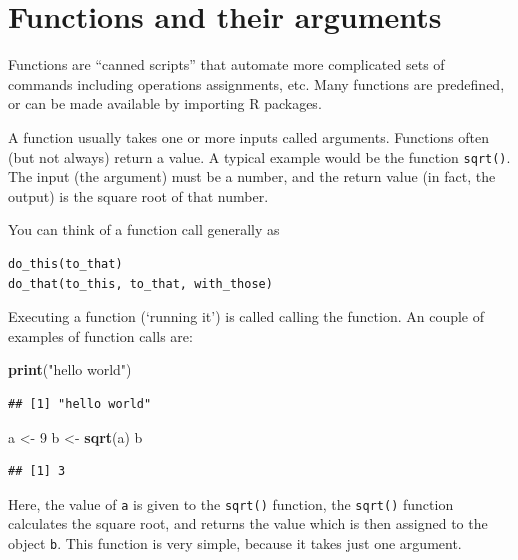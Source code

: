 \documentclass[
]{book}
\newenvironment{Shaded}{\begin{snugshade}}{\end{snugshade}}
\newcommand{\DecValTok}[1]{\textcolor[rgb]{0.00,0.00,0.81}{#1}}
\newcommand{\FunctionTok}[1]{\textcolor[rgb]{0.13,0.29,0.53}{\textbf{#1}}}
\newcommand{\NormalTok}[1]{#1}
\newcommand{\OtherTok}[1]{\textcolor[rgb]{0.56,0.35,0.01}{#1}}
\newcommand{\StringTok}[1]{\textcolor[rgb]{0.31,0.60,0.02}{#1}}
\begin{document}
\section{Functions and their arguments}\label{functions-and-their-arguments}

Functions are ``canned scripts'' that automate more complicated sets of commands including operations assignments, etc. Many functions are predefined, or can be made available by importing R packages.

A function usually takes one or more inputs called arguments. Functions often (but not always) return a value. A typical example would be the function \texttt{sqrt()}. The input (the argument) must be a number, and the return value (in fact, the output) is the square root of that number.

You can think of a function call generally as

\begin{verbatim}
do_this(to_that)
do_that(to_this, to_that, with_those)
\end{verbatim}

Executing a function (`running it') is called calling the function. An couple of examples of function calls are:

\begin{Shaded}
\begin{Highlighting}[]
\FunctionTok{print}\NormalTok{(}\StringTok{"hello world"}\NormalTok{)}
\end{Highlighting}
\end{Shaded}

\begin{verbatim}
## [1] "hello world"
\end{verbatim}

\begin{Shaded}
\begin{Highlighting}[]
\NormalTok{a }\OtherTok{\textless{}{-}} \DecValTok{9}
\NormalTok{b }\OtherTok{\textless{}{-}} \FunctionTok{sqrt}\NormalTok{(a)}
\NormalTok{b}
\end{Highlighting}
\end{Shaded}

\begin{verbatim}
## [1] 3
\end{verbatim}

Here, the value of \texttt{a} is given to the \texttt{sqrt()} function, the \texttt{sqrt()} function calculates the square root, and returns the value which is then assigned to the object \texttt{b}. This function is very simple, because it takes just one argument.
\end{document}
